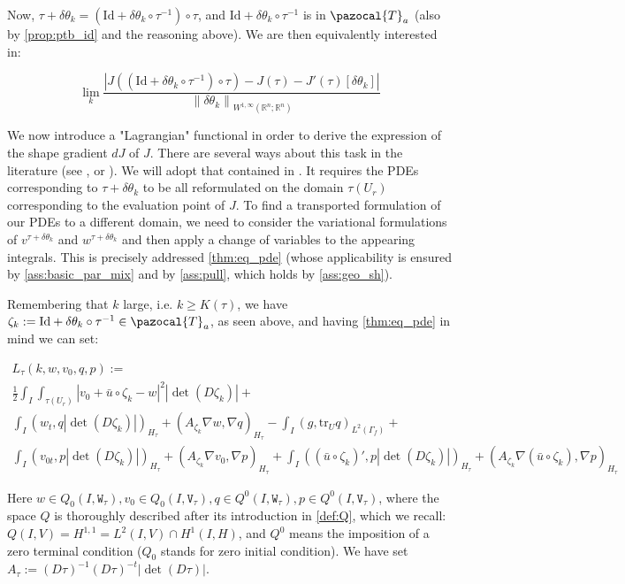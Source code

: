 \documentclass[english,a4paper,9pt,oneside]{scrbook}	%
\theoremstyle{break}
\theoremstyle{remark}
\newcommand{\mR}{\mathbb{R}}
\newcommand{\norm}[1]{\left\lVert#1\right\rVert}
\newcommand{\tr}{\text{tr}}
\newcommand{\cT}{\pazocal{T}}
\newcommand{\id}{\text{Id}}
\newcommand{\te}{\theta}
\newcommand{\tw}[1]{\texttt{#1}}
\begin{document}
Now, $\tau+\delta \te_k  = (\id+\delta\te_k \circ \tau^{-1})\circ \tau$, and $\id+\delta\te_k \circ \tau^{-1}$ is in $\cT_a$ (also by \cref{prop:ptb_id} and the reasoning above). We are then equivalently interested in:

$$\lim_{k}\frac{|J((\id+\delta\te_k \circ \tau^{-1})\circ \tau)-J(\tau)-J'(\tau)[\delta \te_k]|}{\norm{\delta \te_k}_{W^{1,\infty}(\mR^n;\mR^n)}}$$


We now introduce a "Lagrangian" functional in order to derive the expression of the shape gradient $dJ$ of $J$. There are several ways about this task in the literature (see \cite{avg_adj}, \cite{cea} or \cite{lindemann}). We will adopt that contained in \cite{avg_adj}. It requires the PDEs corresponding to $\tau + \delta \te_k$ to be all reformulated on the domain $\tau(U_r)$ corresponding to the evaluation point of $J$. To find a transported formulation of our PDEs to a different domain, we need to consider the variational formulations of $v^{\tau + \delta \te_k}$ and $w^{\tau+\delta \te_k}$ and then apply a change of variables to the appearing integrals. This is precisely addressed \cref{thm:eq_pde} (whose applicability is ensured by \cref{ass:basic_par_mix} and by \cref{ass:pull}, which holds by \cref{ass:geo_sh}).

Remembering that $k$ large, i.e. $k\geq K(\tau)$, we have $\zeta_k:=\id+\delta\te_k \circ \tau^{-1} \in \cT_a$, as seen above, and  having \cref{thm:eq_pde} in mind we can set:

\begin{align*}
L_\tau(k,w,v_0,q,p) := \\
\frac{1}{2}\int_I \int_{\tau(U_r)}|v_0+\bar{u} \circ \zeta_k - w|^2|\det(D\zeta_k)|+\\
\int_I ( w_t , q |\det(D\zeta_k)|)_{H_\tau}+ (A_{\zeta_k}\nabla w, \nabla q)_{H_\tau} -\int_I(g,\tr_{U} q)_{L^2(\Gamma_f)} +\\ \int_I (v_{0t},p |\det(D\zeta_k)|)_{H_\tau} + (A_{\zeta_k} \nabla v_0, \nabla p)_{H_\tau}+\int_I((\bar{u}\circ \zeta_k)',p|\det(D\zeta_k)|)_{H_\tau}+(A_{\zeta_k} \nabla (\bar{u} \circ \zeta_k), \nabla p)_{H_\tau}
\end{align*}

Here $w \in Q_0(I, \tw{W}_\tau), v_0 \in Q_0(I,\tw{V}_\tau), q \in Q^0(I, \tw{W}_\tau), p \in Q^0(I, \tw{V}_\tau)$, where the space $Q$ is thoroughly described after its introduction in \cref{def:Q}, which we recall: $Q(I,V)=H^{1,1}=L^2(I,V)\cap H^1(I,H)$, and $Q^0$ means the imposition of a zero terminal condition ($Q_0$ stands for zero initial condition). We have set $A_\tau:=  (D\tau)^{-1}(D\tau)^{-t}|\det(D\tau)|$.
\end{document}
